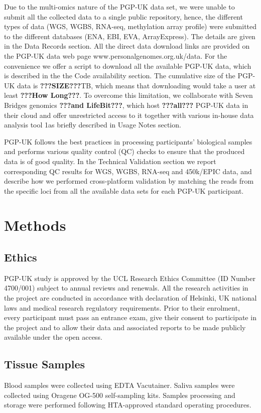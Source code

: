 \documentclass[english]{article}
\begin{document}
Due to the multi-omics nature of the PGP-UK data set, we were unable to submit all the collected data to a single public repository, hence, the different types of data (WGS, WGBS, RNA-seq, methylation array profile) were submitted to the different databases (ENA, EBI, EVA, ArrayExpress). The details are given in the Data Records section. All the direct data download links are provided on the PGP-UK data web page www.personalgenomes.org.uk/data. For the convenience we offer a script to download all the available PGP-UK data, which is described in the the Code availability section. The cumulative size of the PGP-UK data is \textbf{???SIZE???}TB, which means that downloading would take a user at least \textbf{???How Long???}. To overcome this limitation, we collaborate with Seven Bridges genomics \textbf{???and LifeBit???}, which host \textbf{???all???} PGP-UK data in their cloud and offer unrestricted access to it together with various in-house data analysis tool 1as briefly described in Usage Notes section.

PGP-UK follows the best practices in processing participants' biological samples and performs various quality control (QC) checks to ensure that the produced data is of good quality. In the Technical Validation section we report corresponding QC results for WGS, WGBS, RNA-seq and 450k/EPIC data, and describe how we performed cross-platform validation by matching the reads from the specific loci from all the available data sets for each PGP-UK participant.

\section*{Methods}

\subsection*{Ethics}
PGP-UK study is approved by the UCL Research Ethics Committee (ID Number 4700/001) subject to annual reviews and renewals. All the research activities in the project are conducted in accordance with declaration of Helsinki, UK national laws and medical research regulatory requirements. Prior to their enrolment, every participant must pass an entrance exam, give their consent to participate in the project and to allow their data and associated reports to be made publicly available under the open access.

\subsection*{Tissue Samples}
Blood samples were collected using EDTA Vacutainer. Saliva samples were collected using Oragene OG-500 self-sampling kits. Samples processing and storage were performed following HTA-approved standard operating procedures.
\end{document}
